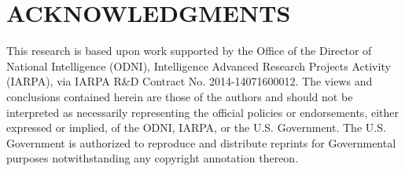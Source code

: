 \documentclass[a4paper, 10pt, conference]{ieeeconf}      %
\begin{document}
\section{ACKNOWLEDGMENTS}
This research is based upon work supported by the Office of the Director of National Intelligence (ODNI), Intelligence Advanced Research Projects Activity (IARPA), via IARPA R\&D Contract No. 2014-14071600012. The views and conclusions contained herein are those of the authors and should not be interpreted as necessarily representing the official policies or endorsements, either expressed
or implied, of the ODNI, IARPA, or the U.S. Government. The U.S. Government is authorized to reproduce and distribute
reprints for Governmental purposes notwithstanding any copyright annotation thereon.





{\small


}
\end{document}
